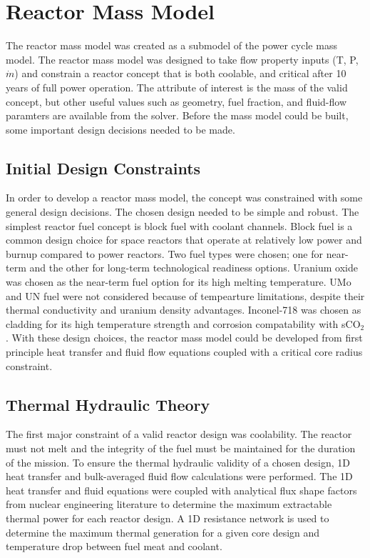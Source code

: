 \section{Reactor Mass Model} \label{reactor_mass_model}
The reactor mass model was created as a submodel of the power cycle mass
model. The reactor mass model was designed to take flow property inputs (T, P,
$\dot{m}$) and constrain a reactor concept that is both coolable, and critical
after 10 years of full power operation. The attribute of interest is the mass of
the valid concept, but other useful values such as geometry, fuel fraction,
and fluid-flow paramters are available from the solver. Before the mass model
could be built, some important design decisions needed to be made.

\subsection{Initial Design Constraints}
    In order to develop a reactor mass model, the concept was constrained with
some general design decisions. The chosen design needed to be simple and robust. The simplest reactor fuel concept is block fuel with coolant channels. 
Block fuel is a common design choice for space reactors that operate at relatively 
low power and burnup compared to power reactors. Two fuel types were chosen; one for
near-term and the other for long-term technological readiness options. Uranium
oxide was chosen as the near-term fuel option for its high melting temperature.
UMo and UN fuel were not considered because of tempearture limitations, despite
their thermal conductivity and uranium density advantages. Inconel-718 was
chosen as cladding for its high temperature strength and corrosion
compatability with sCO$_2$. With these design choices, the reactor mass model
could be developed from first principle heat transfer and fluid flow equations
coupled with a critical core radius constraint.


\subsection{Thermal Hydraulic Theory}
    The first major constraint of a valid reactor design was coolability. The reactor must
not melt and the integrity of the fuel must be maintained for the duration of
the mission. To ensure the thermal hydraulic validity of a chosen design, 
    1D heat transfer and bulk-averaged fluid flow calculations were performed. The 1D
heat transfer and fluid equations were coupled with analytical flux shape
factors from nuclear engineering literature to determine the maximum extractable
thermal power for each reactor design. A 1D resistance network is used to
determine the maximum thermal generation for a given core design and temperature
drop between fuel meat and coolant.

